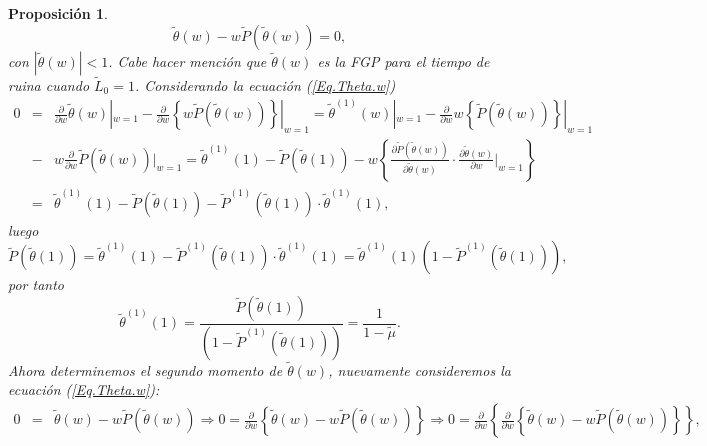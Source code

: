 \documentclass{article}
\newtheorem{Prop}{Proposición}[section]
\numberwithin{equation}{section}
\begin{document}
\begin{Prop}
\begin{equation}\label{Eq.Theta.w}
\tilde{\theta}\left(w\right)-w\tilde{P}\left(\tilde{\theta}\left(w\right)\right)=0,
\end{equation}
con $|\tilde{\theta}\left(w\right)|<1$. Cabe hacer menci\'on que $\tilde{\theta}\left(w\right)$ es la FGP para el tiempo de ruina cuando $\tilde{L}_{0}=1$. Considerando la ecuaci\'on (\ref{Eq.Theta.w})
\begin{eqnarray*}
0&=&\frac{\partial}{\partial w}\tilde{\theta}\left(w\right)|_{w=1}-\frac{\partial}{\partial w}\left\{w\tilde{P}\left(\tilde{\theta}\left(w\right)\right)\right\}|_{w=1}=\tilde{\theta}^{(1)}\left(w\right)|_{w=1}-\frac{\partial}{\partial w}w\left\{\tilde{P}\left(\tilde{\theta}\left(w\right)\right)\right\}|_{w=1}\\
&-&w\frac{\partial}{\partial w}\tilde{P}\left(\tilde{\theta}\left(w\right)\right)|_{w=1}=\tilde{\theta}^{(1)}\left(1\right)-\tilde{P}\left(\tilde{\theta}\left(1\right)\right)-w\left\{\frac{\partial \tilde{P}\left(\tilde{\theta}\left(w\right)\right)}{\partial \tilde{\theta}\left(w\right)}\cdot\frac{\partial\tilde{\theta}\left(w\right)}{\partial w}|_{w=1}\right\}\\
&=&\tilde{\theta}^{(1)}\left(1\right)-\tilde{P}\left(\tilde{\theta}\left(1\right)
\right)-\tilde{P}^{(1)}\left(\tilde{\theta}\left(1\right)\right)\cdot\tilde{\theta}^{(1)}\left(1\right),
\end{eqnarray*}
luego
$$\tilde{P}\left(\tilde{\theta}\left(1\right)\right)=\tilde{\theta}^{(1)}\left(1\right)-\tilde{P}^{(1)}\left(\tilde{\theta}\left(1\right)\right)\cdot\tilde{\theta}^{(1)}\left(1\right)=\tilde{\theta}^{(1)}\left(1\right)\left(1-\tilde{P}^{(1)}\left(\tilde{\theta}\left(1\right)\right)\right),$$
por tanto $$\tilde{\theta}^{(1)}\left(1\right)=\frac{\tilde{P}\left(\tilde{\theta}\left(1\right)\right)}{\left(1-\tilde{P}^{(1)}\left(\tilde{\theta}\left(1\right)\right)\right)}=\frac{1}{1-\tilde{\mu}}.$$
Ahora determinemos el segundo momento de $\tilde{\theta}\left(w\right)$,
nuevamente consideremos la ecuaci\'on (\ref{Eq.Theta.w}):
\begin{eqnarray*}
0&=&\tilde{\theta}\left(w\right)-w\tilde{P}\left(\tilde{\theta}\left(w\right)\right)\Rightarrow 0=\frac{\partial}{\partial w}\left\{\tilde{\theta}\left(w\right)-w\tilde{P}\left(\tilde{\theta}\left(w\right)\right)\right\}\Rightarrow 0=\frac{\partial}{\partial w}\left\{\frac{\partial}{\partial w}\left\{\tilde{\theta}\left(w\right)-w\tilde{P}\left(\tilde{\theta}\left(w\right)\right)\right\}\right\},
\end{eqnarray*}

\end{Prop}
\end{document}
